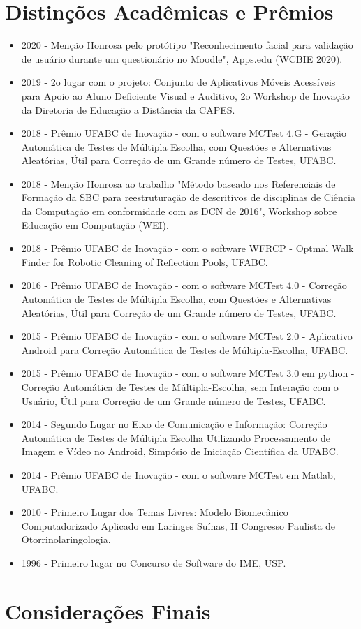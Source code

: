 \section{Distinções Acadêmicas e Prêmios}

\begin{itemize}
    \item 2020 - Menção Honrosa pelo protótipo "Reconhecimento facial para validação de usuário durante um questionário no Moodle", Apps.edu (WCBIE 2020).
   \item 2019 - 2o lugar com o projeto: Conjunto de Aplicativos Móveis Acessíveis para Apoio ao Aluno Deficiente Visual e Auditivo, 2o Workshop de Inovação da Diretoria de Educação a Distância da CAPES.
   \item 2018 - Prêmio UFABC de Inovação - com o software MCTest 4.G - Geração Automática de Testes de Múltipla Escolha, com Questões e Alternativas Aleatórias, Útil para Correção de um Grande número de Testes, UFABC.
   \item 2018 - Menção Honrosa ao trabalho "Método baseado nos Referenciais de Formação da SBC para reestruturação de descritivos de disciplinas de Ciência da Computação em conformidade com as DCN de 2016", Workshop sobre Educação em Computação (WEI).
   \item 2018 - Prêmio UFABC de Inovação - com o software WFRCP - Optmal Walk Finder for Robotic Cleaning of Reflection Pools, UFABC.
   \item 2016 - Prêmio UFABC de Inovação - com o software MCTest 4.0 - Correção Automática de Testes de Múltipla Escolha, com Questões e Alternativas Aleatórias, Útil para Correção de um Grande número de Testes, UFABC.
   \item 2015 - Prêmio UFABC de Inovação - com o software MCTest 2.0 - Aplicativo Android para Correção Automática de Testes de Múltipla-Escolha, UFABC.
   \item 2015 - Prêmio UFABC de Inovação - com o software MCTest 3.0 em python - Correção Automática de Testes de Múltipla-Escolha, sem Interação com o Usuário, Útil para Correção de um Grande número de Testes, UFABC.
   \item 2014 - Segundo Lugar no Eixo de Comunicação e Informação: Correção Automática de Testes de Múltipla Escolha Utilizando Processamento de Imagem e Vídeo no Android, Simpósio de Iniciação Científica da UFABC.
   \item 2014 - Prêmio UFABC de Inovação - com o software MCTest em Matlab, UFABC.
   \item 2010 - Primeiro Lugar dos Temas Livres: Modelo Biomecânico Computadorizado Aplicado em Laringes Suínas, II Congresso Paulista de Otorrinolaringologia.
   \item 1996 - Primeiro lugar no Concurso de Software do IME, USP.
\end{itemize}
\section{Considerações Finais}






